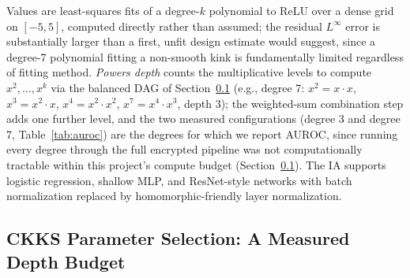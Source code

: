\documentclass[journal,compsoc]{IEEEtran}
\begin{document}
Values are least-squares fits of a degree-$k$ polynomial to ReLU over a dense
grid on $[-5,5]$, computed directly rather than assumed; the residual
$L^\infty$ error is substantially larger than a first, unfit design estimate
would suggest, since a degree-7 polynomial fitting a non-smooth kink is
fundamentally limited regardless of fitting method. \emph{Powers depth} counts
the multiplicative levels to compute $x^2,\ldots,x^k$ via the balanced DAG of
Section~\ref{sec:ckks-depth} (e.g., degree 7: $x^2{=}x{\cdot}x$,
$x^3{=}x^2{\cdot}x$, $x^4{=}x^2{\cdot}x^2$, $x^7{=}x^4{\cdot}x^3$, depth 3);
the weighted-sum combination step adds one further level, and the two
measured configurations (degree 3 and degree 7, Table~\ref{tab:auroc}) are the
degrees for which we report AUROC, since running every degree through the
full encrypted pipeline was not computationally tractable within this
project's compute budget (Section~\ref{sec:ckks-depth}). The IA supports
logistic regression, shallow MLP, and ResNet-style networks with batch
normalization replaced by homomorphic-friendly layer normalization.

\subsection{CKKS Parameter Selection: A Measured Depth Budget}
\label{sec:ckks-depth}
\end{document}
